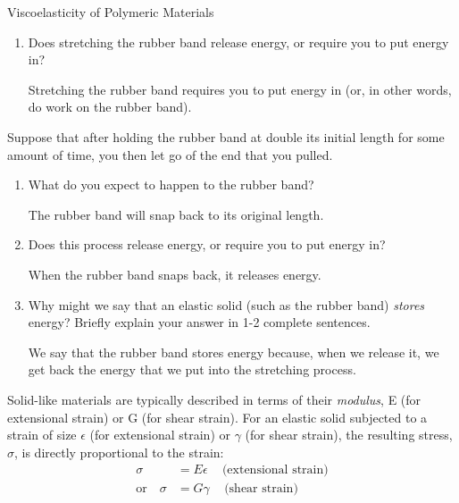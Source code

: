 \begin{activity}{Viscoelasticity of Polymeric Materials}
\begin{ctqs}
\begin{enumerate}
			\item Does stretching the rubber band release energy, or require you to put energy in?
			
				\begin{solution}[1.2in]
					Stretching the rubber band requires you to put energy in (or, in other words, do work on the rubber band).
				\end{solution}
			
		\end{enumerate}
		
	\question Suppose that after holding the rubber band at double its initial length for some amount of time, you then let go of the end that you pulled.
	
		\begin{enumerate}
			
			\item What do you expect to happen to the rubber band?
			
				\begin{solution}[1in]
					The rubber band will snap back to its original length.
				\end{solution}
			
			\item Does this process release energy, or require you to put energy in?
			
				\begin{solution}[1in]
					When the rubber band snaps back, it releases energy.
				\end{solution}
			
			\item Why might we say that an elastic solid (such as the rubber band) \emph{stores} energy?  Briefly explain your answer in 1-2 complete sentences.
			
				\begin{solution}[2in]
					We say that the rubber band stores energy because, when we release it, we get back the energy that we put into the stretching process.
				\end{solution}
			
		\end{enumerate}
	
\end{ctqs}

\begin{infobox}

	Solid-like materials are typically described in terms of their \emph{modulus}, E (for extensional strain) or G (for shear strain).  For an elastic solid subjected to a strain of size $\epsilon$ (for extensional strain) or $\gamma$ (for shear strain), the resulting stress, $\sigma$, is directly proportional to the strain:
	\begin{align*}
		\sigma &= E\epsilon\,\,\,\,\,\,\,\text{(extensional strain)}\\
		\text{or}\,\,\,\,\,\,\sigma &= G\gamma\,\,\,\,\,\,\,\text{(shear strain)}
	\end{align*}
	

\end{infobox}
\end{activity}
